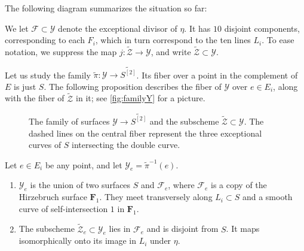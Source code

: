 \documentclass[11pt,reqno, letterpaper]{amsart}
\renewcommand{\to}{{\longrightarrow}}
\numberwithin{equation}{section}
\newcommand{\F}{\mathbf F}
\newcommand{\td}{\widetilde}
\begin{document}
The following diagram summarizes the situation so far:
\begin{center}
\end{center}

We let $\mathcal{F} \subset \mathcal{Y}$ denote the exceptional
divisor of $\eta$. It has $10$ disjoint components, corresponding to
each $F_{i}$, which in turn correspond to the ten lines $L_{i}$.
To ease notation, we suppress the map $j \colon \widetilde{\mathcal Z} \to \mathcal Y$, and write $\widetilde{\mathcal Z} \subset \mathcal Y$.

Let us study the family $\widetilde \pi \colon \mathcal Y \to \widetilde{S^{[2]}}$.
Its fiber over a point in the complement of $E$ is just $S$.
The following proposition describes the fiber of $\mathcal Y$ over $e \in E_i$, along with the fiber of $\widetilde{\mathcal Z}$ in it; see \autoref{fig:familyY} for a picture.
\begin{figure}
  \centering
    
    \caption{The family of surfaces $\mathcal Y \to \widetilde {S^{[2]}}$ and the subscheme $\widetilde {\mathcal Z} \subset \mathcal Y$.
      The dashed lines on the central fiber represent the three exceptional curves of $S$ intersecting the double curve.
    }
    \label{fig:familyY}
\end{figure}

\begin{proposition}
  \label{prop:geometry}
  Let $e \in E_{i}$ be any point, and let
  $\mathcal{Y}_{e} = \widetilde \pi^{-1}(e)$.
  \begin{enumerate}
  \item $\mathcal{Y}_{e}$ is the union of two surfaces $S$ and $\mathcal F_e$, where $\mathcal F_e$ is a copy of the Hirzebruch surface $\F_1$.
    They meet transversely along $L_{i} \subset S$ and a smooth curve of self-intersection $1$ in $\F_1$.
  \item The subscheme $\widetilde{\mathcal Z}_e \subset \mathcal Y_e$ lies in $\mathcal F_e$ and is disjoint from $S$.
    It maps isomorphically onto its image in $L_{i}$ under $\eta$.
  \end{enumerate}
\end{proposition}
\end{document}
